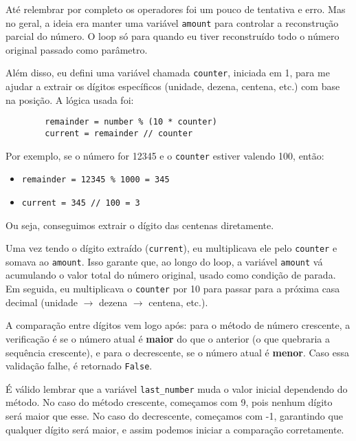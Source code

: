 \documentclass[9pt,a4paper,twocolumn,twoside]{tau-class/tau}
\begin{document}
        Até relembrar por completo os operadores foi um pouco de tentativa e erro. Mas no geral, a ideia era manter uma variável \texttt{amount} para controlar a reconstrução parcial do número. O loop só para quando eu tiver reconstruído todo o número original passado como parâmetro. 
        
        Além disso, eu defini uma variável chamada \texttt{counter}, iniciada em 1, para me ajudar a extrair os dígitos específicos (unidade, dezena, centena, etc.) com base na posição. A lógica usada foi:
        
        \begin{verbatim}
        remainder = number % (10 * counter)
        current = remainder // counter
        \end{verbatim}
        
        Por exemplo, se o número for 12345 e o \texttt{counter} estiver valendo 100, então:
        
        \begin{itemize}
          \item \texttt{remainder = 12345 \% 1000 = 345}
          \item \texttt{current = 345 // 100 = 3}
        \end{itemize}
        
        Ou seja, conseguimos extrair o dígito das centenas diretamente.
        
        Uma vez tendo o dígito extraído (\texttt{current}), eu multiplicava ele pelo \texttt{counter} e somava ao \texttt{amount}. Isso garante que, ao longo do loop, a variável \texttt{amount} vá acumulando o valor total do número original, usado como condição de parada. Em seguida, eu multiplicava o \texttt{counter} por 10 para passar para a próxima casa decimal (unidade $\rightarrow$ dezena $\rightarrow$ centena, etc.).
        
        A comparação entre dígitos vem logo após: para o método de número crescente, a verificação é se o número atual é \textbf{maior} do que o anterior (o que quebraria a sequência crescente), e para o decrescente, se o número atual é \textbf{menor}. Caso essa validação falhe, é retornado \texttt{False}.
        
        É válido lembrar que a variável \texttt{last\_number} muda o valor inicial dependendo do método. No caso do método crescente, começamos com 9, pois nenhum dígito será maior que esse. No caso do decrescente, começamos com -1, garantindo que qualquer dígito será maior, e assim podemos iniciar a comparação corretamente.
        
\end{document}
